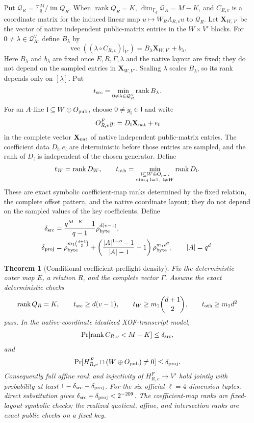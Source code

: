 \documentclass[11pt]{article}
\newtheorem{theorem}{Theorem}[section]
\newcommand{\F}{\mathbb F}
\newcommand{\rank}{\operatorname{rank}}
\newcommand{\im}{\operatorname{im}}
\begin{document}
Put $\mathcal Q_R=\F_q^M/\im Q_R$.  When $\rank Q_R=K$,
$\dim_{\F_q}\mathcal Q_R=M-K$, and $C_{R,v}$ is a coordinate matrix for the
induced linear map $u\mapsto W_R\Lambda_{R,v}u$ to $\mathcal Q_R$.  Let
$\mathbf X_{W,V'}$ be the vector of native independent public-matrix entries
in the $W\times V'$ blocks.  For
$0\ne\lambda\in\mathcal Q_R^\vee$, define $B_\lambda$ by
\[
 \operatorname{vec}\!\left(
   (\lambda\circ C_{R,v})|_{V'}\right)
 =B_\lambda\mathbf X_{W,V'}+b_\lambda.
\]
Here $B_\lambda$ and $b_\lambda$ are fixed once $E,R,\Gamma,\lambda$ and the
native layout are fixed; they do not depend on the sampled entries in
$\mathbf X_{W,V'}$.
Scaling $\lambda$ scales $B_\lambda$, so its rank depends only on
$[\lambda]$.  Put
\[
 t_{\rm src}
 =\min_{0\ne\lambda\in\mathcal Q_R^\vee}\rank B_\lambda.
\]
For an $A$-line $\mathfrak l\subseteq W\oplus O_{\rm pub}$, choose
$0\ne y_{\mathfrak l}\in\mathfrak l$ and write
\[
 O^F_{R,v}y_{\mathfrak l}
 =D_{\mathfrak l}\mathbf X_{\rm nat}+e_{\mathfrak l}
\]
in the complete vector $\mathbf X_{\rm nat}$ of native independent
public-matrix entries.  The coefficient data
$D_{\mathfrak l},e_{\mathfrak l}$ are deterministic before those entries are
sampled, and the rank of $D_{\mathfrak l}$ is independent of the chosen
generator.  Define
\[
 t_W=\rank D_W,\qquad
 t_{\rm oth}=
 \min_{\substack{\mathfrak l\subseteq W\oplus O_{\rm pub}\\
                   \dim_A\mathfrak l=1,\ \mathfrak l\ne W}}
 \rank D_{\mathfrak l}.
\]
These are exact symbolic coefficient-map ranks determined by the fixed
relation, the complete offset pattern, and the native coordinate layout; they
do not depend on the sampled values of the key coefficients.  Define
\begin{align}
 \delta_{\rm src}
 &=\frac{q^{M-K}-1}{q-1}
   \rho_{\rm byte}^{d(v-1)},                          \label{eq:delta-src}\\
 \delta_{\rm proj}
 &=\rho_{\rm byte}^{m_1\binom{d+1}{2}}+
   \left(\frac{|A|^{1+o}-1}{|A|-1}-1\right)
   \rho_{\rm byte}^{m_1d^2},
 \qquad |A|=q^d.                                      \label{eq:delta-proj}
\end{align}

\begin{theorem}[Conditional coefficient-preflight density]
\label{thm:structural-preflight}
Fix the deterministic outer map $E$, a relation $R$, and the complete vector
$\Gamma$.  Assume the exact deterministic checks
\[
\rank Q_R=K,\qquad
t_{\rm src}\ge d(v-1),\qquad
t_W\ge m_1\binom{d+1}{2},\qquad
t_{\rm oth}\ge m_1d^2
\]
pass.  In the native-coordinate idealized XOF-transcript model,
\[
 \Pr[\rank C_{R,v}<M-K]\le\delta_{\rm src},
\]
and
\[
 \Pr[H^F_{R,v}\cap(W\oplus O_{\rm pub})\ne0]
 \le\delta_{\rm proj}.
\]
Consequently full affine rank and injectivity of
$H^F_{R,v}\to V'$ hold jointly with probability at least
$1-\delta_{\rm src}-\delta_{\rm proj}$.  For the six official $\ell=4$
dimension tuples, direct substitution gives
$\delta_{\rm src}+\delta_{\rm proj}<2^{-209}$.  The coefficient-map ranks are
fixed-layout symbolic checks; the realized quotient, affine, and intersection
ranks are exact public checks on a fixed key.
\end{theorem}
\end{document}

